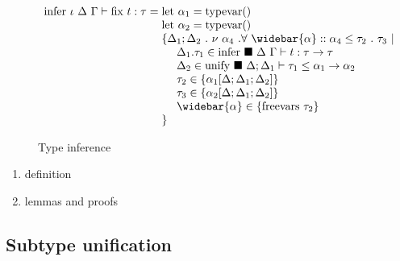 \documentclass[sigplan,screen]{acmart}
\begin{document}
\begin{figure*}[h]
\[\begin{array}{l @{} l}
      \text{infer } \iota\ \Delta\ \Gamma \vdash 
      \text{fix } t : \tau      
      &{} =
      \begin{array}[t]{@{} l}
        \text{let } \alpha_1 = \text{typevar}()
        \\
        \text{let } \alpha_2 = \text{typevar}()
        \\
        \{ \Delta_1;\Delta_2\ .\ \nu\ \alpha_4 \ . \forall\ \widebar{\alpha} ::
          \alpha_4 \leq \tau_2\ .\ \tau_3
          \ |\ 
        \\
        \ \ \ \ \Delta_1.\tau_1 \in
        \text{infer } \blacksquare\ \Delta\ \Gamma \vdash t : \tau \rightarrow \tau
        \\
        \ \ \ \ \Delta_2 \in \text{unify } \blacksquare\ \Delta;\Delta_1 \vdash 
        \tau_1 \leq \alpha_1 \rightarrow \alpha_2 
        \\
        \ \ \ \ \tau_2 \in \{\alpha_1[\Delta;\Delta_1;\Delta_2]\}
        \\ 
        \ \ \ \ \tau_3 \in \{\alpha_2[\Delta;\Delta_1;\Delta_2]\} 
        \\
        \ \ \ \ \widebar{\alpha} \in \{ \text{freevars}\ \tau_2 \}
        \\
        \} 
      \end{array}
    \end{array}
  \]
  \caption{Type inference}
\end{figure*}


\begin{enumerate}
  \item definition 
  \item lemmas and proofs 
\end{enumerate}

\subsection{Subtype unification}
\end{document}
